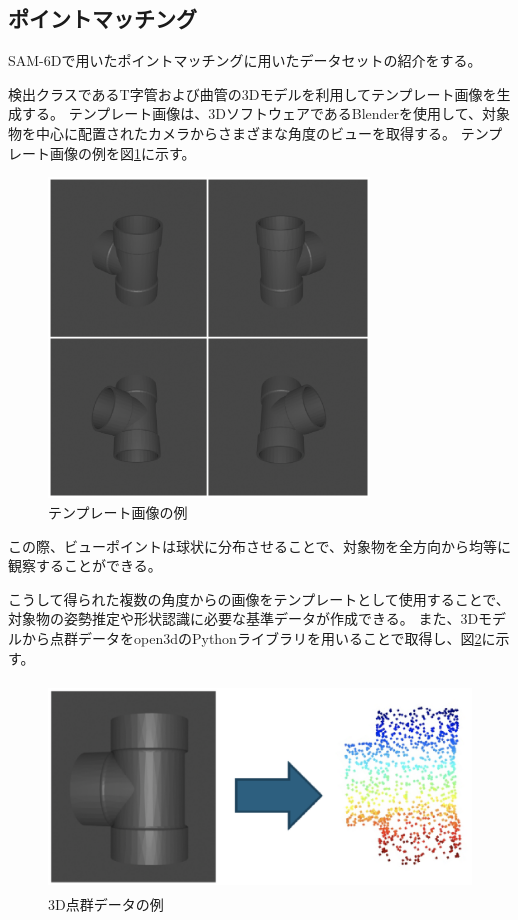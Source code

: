 \subsection{ポイントマッチング}
SAM-6Dで用いたポイントマッチングに用いたデータセットの紹介をする。

検出クラスであるT字管および曲管の3Dモデルを利用してテンプレート画像を生成する。
テンプレート画像は、3DソフトウェアであるBlenderを使用して、対象物を中心に配置されたカメラからさまざまな角度のビューを取得する。
テンプレート画像の例を図\ref{fig:f5}に示す。
\begin{figure}[htbt]
  \centering
   \includegraphics[height=85mm]{Figure/template.eps}
   \caption{テンプレート画像の例}
   \label{fig:f5}
\end{figure}

この際、ビューポイントは球状に分布させることで、対象物を全方向から均等に観察することができる。

こうして得られた複数の角度からの画像をテンプレートとして使用することで、対象物の姿勢推定や形状認識に必要な基準データが作成できる。
また、3Dモデルから点群データをopen3dのPythonライブラリを用いることで取得し、図\ref{fig:f6}に示す。
\begin{figure}[htbt]
  \centering
   \includegraphics[height=55mm]{Figure/point_cloud.eps}
   \caption{3D点群データの例}
   \label{fig:f6}
\end{figure}

